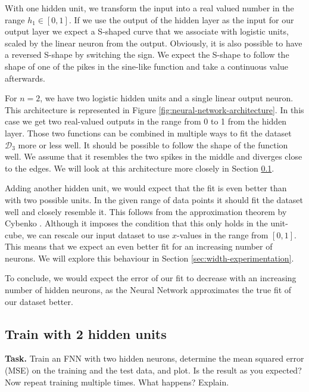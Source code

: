 \documentclass{support/acm_proc_article-sp}
\begin{document}
    With one hidden unit, we transform the input into a real valued number in the range $h_1 \in [0, 1]$.
    If we use the output of the hidden layer as the input for our output layer we expect a S-shaped curve that we associate
    with logistic units, scaled by the linear neuron from the output.
    Obviously, it is also possible to have a reversed S-shape by switching the sign.
    We expect the S-shape to follow the shape of one of the pikes in the sine-like function and take a continuous value
    afterwards.

    For $n=2$, we have two logistic hidden units and a single linear output neuron.
    This architecture is represented in Figure \ref{fig:neural-network-architecture}.
    In this case we get two real-valued outputs in the range from 0 to 1 from the hidden layer.
    Those two functions can be combined in multiple ways to fit the dataset $\mathcal{D}_3$ more or less well.
    It should be possible to follow the shape of the function well.
    We assume that it resembles the two spikes in the middle and diverges close to the edges.
    We will look at this architecture more closely in Section \ref{sec:train-2-units}.

    Adding another hidden unit, we would expect that the fit is even better than with two possible units.
    In the given range of data points it should fit the dataset well and closely resemble it.
    This follows from the approximation theorem by Cybenko \cite{Cybenko1989}.
    Although it imposes the condition that this only holds in the unit-cube, we can rescale our input dataset to use
    $x$-values in the range from $[0, 1]$.
    This means that we expect an even better fit for an increasing number of neurons.
    We will explore this behaviour in Section \ref{sec:width-experimentation}.

    To conclude, we would expect the error of our fit to decrease with an increasing number of hidden neurons, as the Neural Network
    approximates the true fit of our dataset better.


    \subsection{Train with 2 hidden units}
    \label{sec:train-2-units}

    \textbf{Task.} Train an FNN with two hidden neurons, determine the mean squared error (MSE) on the training and the
    test data, and plot.
    Is the result as you expected?
    Now repeat training multiple times.
    What happens?
    Explain.
\end{document}
